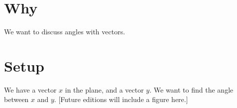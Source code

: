 

\section*{Why}

We want to discuss angles with vectors.
\section*{Setup}

We have a vector $x$ in the plane, and a vector $y$.
We want to find the angle between $x$ and $y$.
[Future editions will include a figure here.]
\blankpage